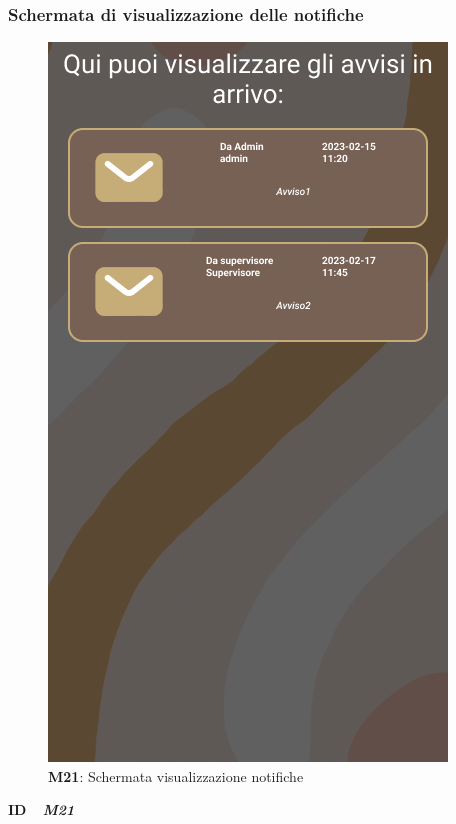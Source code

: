                     \subsubsection{Schermata di visualizzazione delle notifiche}
                      \begin{figure}[H]
                        \centering
                        \includegraphics[scale=0.4]{assets/diagrammi/Mockup/Mockup_Notifications.png}
                        \caption*{\textbf{M21}: Schermata visualizzazione notifiche}\label{fig:Mockup_Notifications}
                      \end{figure}

                      \begin{flushleft}
                        \textbf{ID}   \ \Large{ \emph{\textbf{M21}}}
                      \end{flushleft}

